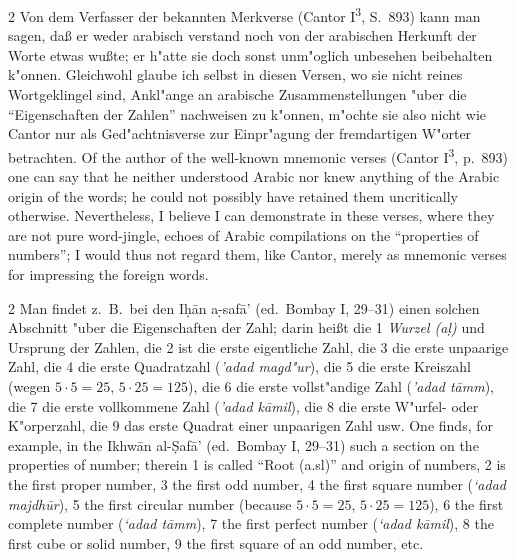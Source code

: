 \documentclass[10pt,a4paper]{article}
\renewcommand{\switchcolumn}{\syncronize\nointerlineskip\columnbreak}
\newcommand{\s}[1]{\d{#1}}
\newcommand{\hw}{\d{h}}
\newcommand{\enquote}[1]{``#1''}
\begin{document}
\begin{paracol}{2}
Von dem Verfasser der bekannten Merkverse (Cantor I\textsuperscript{3}, S.\ 893) kann man sagen, da\ss{} er weder arabisch verstand noch von der arabischen Herkunft der Worte etwas wu\ss{}te; er h"atte sie doch sonst unm"oglich unbesehen beibehalten k"onnen. Gleichwohl glaube ich selbst in diesen Versen, wo sie nicht reines Wortgeklingel sind, Ankl"ange an arabische Zusammenstellungen "uber die \enquote{Eigenschaften der Zahlen} nachweisen zu k"onnen, m"ochte sie also nicht wie Cantor nur als Ged"achtnisverse zur Einpr"agung der fremdartigen W"orter betrachten.
\switchcolumn
Of the author of the well-known mnemonic verses (Cantor I\textsuperscript{3}, p.\ 893) one can say that he neither understood Arabic nor knew anything of the Arabic origin of the words; he could not possibly have retained them uncritically otherwise. Nevertheless, I believe I can demonstrate in these verses, where they are not pure word-jingle, echoes of Arabic compilations on the ``properties of numbers''; I would thus not regard them, like Cantor, merely as mnemonic verses for impressing the foreign words.
\end{paracol}

\begin{paracol}{2}
Man findet z.\ B.\ bei den I\hw{}\=an a\s-s{}af\=a' (ed.\ Bombay I, 29--31) einen solchen Abschnitt "uber die Eigenschaften der Zahl; darin hei\ss{}t die 1 \textit{Wurzel (a\s{l})} und Ursprung der Zahlen, die 2 ist die erste eigentliche Zahl, die 3 die erste unpaarige Zahl, die 4 die erste Quadratzahl (\textit{'adad ma\d{g}d"ur}), die 5 die erste Kreiszahl (wegen $5 \cdot 5 = 25$, $5 \cdot 25 = 125$), die 6 die erste vollst"andige Zahl (\textit{'adad t\=amm}), die 7 die erste vollkommene Zahl (\textit{'adad k\=amil}), die 8 die erste W"urfel- oder K"orperzahl, die 9 das erste Quadrat einer unpaarigen Zahl usw.
\switchcolumn
One finds, for example, in the Ikhw\=an al-\d{S}af\=a' (ed.\ Bombay I, 29--31) such a section on the properties of number; therein 1 is called ``Root (a.sl)'' and origin of numbers, 2 is the first proper number, 3 the first odd number, 4 the first square number (\textit{`adad majdh\=ur}), 5 the first circular number (because $5 \cdot 5 = 25$, $5 \cdot 25 = 125$), 6 the first complete number (\textit{`adad t\=amm}), 7 the first perfect number (\textit{`adad k\=amil}), 8 the first cube or solid number, 9 the first square of an odd number, etc.
\end{paracol}
\end{document}
